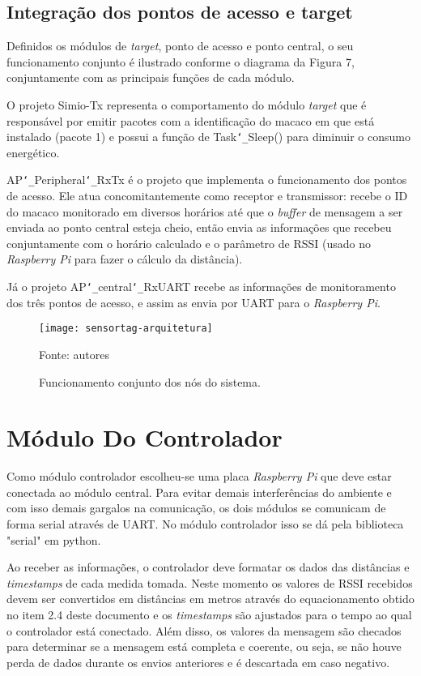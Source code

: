 \subsection{Integração dos pontos de acesso e target}

Definidos os módulos de \emph{target}, ponto de acesso e ponto central, o seu funcionamento conjunto é ilustrado conforme o diagrama da Figura 7, conjuntamente com as principais funções de cada módulo.

O projeto Simio-Tx representa o comportamento do módulo \emph{target} que é responsável por emitir pacotes com a identificação do macaco em que está instalado (pacote 1) e possui a função de Task\texttt{\char`\_}Sleep() para diminuir o consumo energético.

AP\texttt{\char`\_}Peripheral\texttt{\char`\_}RxTx é o projeto que implementa o funcionamento dos pontos de acesso. Ele atua concomitantemente como receptor e transmissor: recebe o ID do macaco monitorado em diversos horários até que o \emph{buffer} de mensagem a ser enviada ao ponto central esteja cheio, então envia as informações que recebeu conjuntamente com o horário calculado e o parâmetro de RSSI (usado no \emph{Raspberry Pi} para fazer o cálculo da distância).

Já o projeto AP\texttt{\char`\_}central\texttt{\char`\_}RxUART recebe as informações de monitoramento dos três pontos de acesso, e assim as envia por UART para o \emph{Raspberry Pi}.

\begin{figure}[ht]
  \centering
    \caption{ Funcionamento conjunto dos nós do sistema.}
    \texttt{[image: sensortag-arquitetura]}
  \centerline{\small{Fonte: autores}}
\end{figure}
\FloatBarrier

\section{Módulo Do Controlador}

Como módulo controlador escolheu-se uma placa \emph{Raspberry Pi} que deve estar conectada ao módulo central. Para evitar demais interferências do ambiente e com isso demais gargalos na comunicação, os dois módulos se comunicam de forma serial através de UART. No módulo controlador isso se dá pela biblioteca "serial" em python.

Ao receber as informações, o controlador deve formatar os dados das distâncias e \emph{timestamps} de cada medida tomada. Neste momento os valores de RSSI recebidos devem ser convertidos em distâncias em metros através do equacionamento obtido no item 2.4 deste documento e os \emph{timestamps} são ajustados para o tempo ao qual o controlador está conectado. Além disso, os valores da mensagem são checados para determinar se a mensagem está completa e coerente, ou seja, se não houve perda de dados durante os envios anteriores e é descartada em caso negativo.

